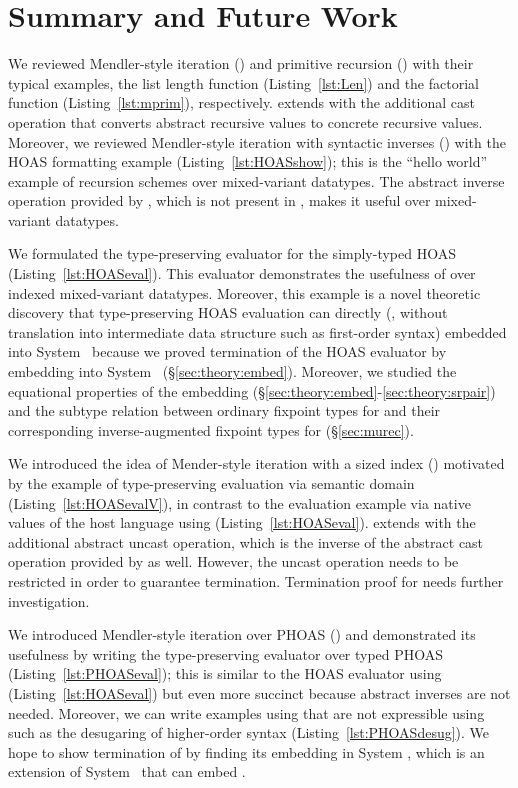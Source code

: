 \section{Summary and Future Work}

We reviewed Mendler-style iteration (\MIt{}) and
primitive recursion (\mpr{}) with their typical examples,
the list length function (Listing~\ref{lst:Len}) and
the factorial function (Listing~\ref{lst:mprim}), respectively.
\mpr{} extends \mit{} with the additional cast operation that
converts abstract recursive values to concrete recursive values.
Moreover, we reviewed Mendler-style iteration with syntactic
inverses (\msfit{}) with the HOAS formatting example (Listing~\ref{lst:HOASshow});
this is the ``hello world'' example of recursion schemes over
mixed-variant datatypes. The abstract inverse operation provided
by \msfit{}, which is not present in \MIt{}, makes it useful over
mixed-variant datatypes.

We formulated the type-preserving evaluator for the simply-typed HOAS
(Listing~\ref{lst:HOASeval}). This evaluator demonstrates the usefulness
of \msfit{} over indexed mixed-variant datatypes. Moreover, this
example is a novel theoretic discovery that type-preserving HOAS
evaluation can directly (\ie, without translation into intermediate
data structure such as first-order syntax) embedded into System \Fw\ 
because we proved termination of the HOAS evaluator by embedding
\msfit{} into System \Fw\ (\S\ref{sec:theory:embed}). Moreover,
we studied the equational properties of the embedding
(\S\ref{sec:theory:embed}-\ref{sec:theory:srpair}) and
the subtype relation between ordinary fixpoint types for \MIt{} and
their corresponding inverse-augmented fixpoint types for \msfit{}
(\S\ref{sec:murec}).

We introduced the idea of Mender-style iteration with a sized index
(\mprsi{}) motivated by the example of type-preserving evaluation
via semantic domain (Listing~\ref{lst:HOASevalV}), in contrast to 
the evaluation example via native values of the host language
using \msfit{} (Listing~\ref{lst:HOASeval}). \mprsi{} extends \mpr{}
with the additional abstract uncast operation, which is
the inverse of the abstract cast operation provided by \mpr{} as well.
However, the uncast operation needs to be restricted in order to
guarantee termination. Termination proof for \mprsi{} needs
further investigation.

We introduced Mendler-style iteration over PHOAS (\mphit{}) and
demonstrated its usefulness by writing the type-preserving evaluator
over typed PHOAS (Listing~\ref{lst:PHOASeval}); this is similar to
the HOAS evaluator using \msfit{} (Listing~\ref{lst:HOASeval}) but
even more succinct because abstract inverses are not needed.
Moreover, we can write examples using \mphit{} that are
not expressible using \msfit{} such as the desugaring of
higher-order syntax (Listing~\ref{lst:PHOASdesug}). We hope to show
termination of \mphit{} by finding its embedding in System \Fixw,
which is an extension of System \Fw\ that can embed \mpr{}.

